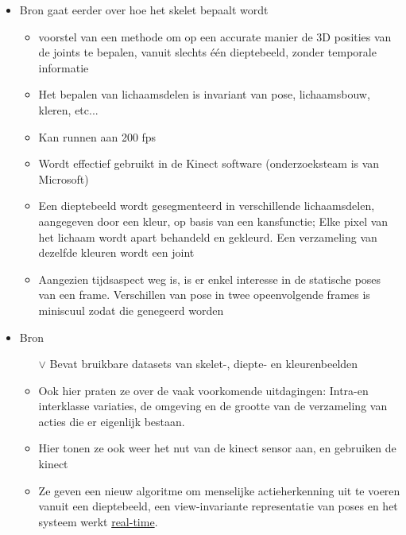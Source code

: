 \begin{itemize}
	\item Bron \cite{real-time-human-pose-recognition-in-parts-from-a-single-depth-image}
	gaat eerder over hoe het skelet bepaalt wordt
	\begin{itemize}
		\item voorstel van een methode om op een accurate manier de 3D posities van de joints te bepalen, vanuit slechts één dieptebeeld, zonder temporale informatie
		\item Het bepalen van lichaamsdelen is invariant van pose, lichaamsbouw, kleren, etc...
		\item Kan runnen aan 200 fps
		\item Wordt effectief gebruikt in de Kinect software (onderzoeksteam is van Microsoft)
		\item Een dieptebeeld wordt gesegmenteerd in verschillende lichaamsdelen, aangegeven door een kleur, op basis van een kansfunctie; Elke pixel van het lichaam wordt apart behandeld en gekleurd. Een verzameling van dezelfde kleuren wordt een joint
		\item Aangezien tijdsaspect weg is, is er enkel interesse in de statische poses van een frame. Verschillen van pose in twee opeenvolgende frames is miniscuul zodat die genegeerd worden
	\end{itemize}

	\item Bron \cite{xia2012view}
	\begin{itemize}
		\item[$\vee$] Bevat bruikbare datasets van skelet-, diepte- en kleurenbeelden
		\item Ook hier praten ze over de vaak voorkomende uitdagingen: Intra-en interklasse variaties, de omgeving en de grootte van de verzameling van acties die er eigenlijk bestaan.
		\item Hier tonen ze ook weer het nut van de kinect sensor aan, en gebruiken de kinect
		\item Ze geven een nieuw algoritme om menselijke actieherkenning uit te voeren vanuit een dieptebeeld, een view-invariante representatie van poses en het systeem werkt \underline{real-time}. 
		

\end{itemize}
\end{itemize}
